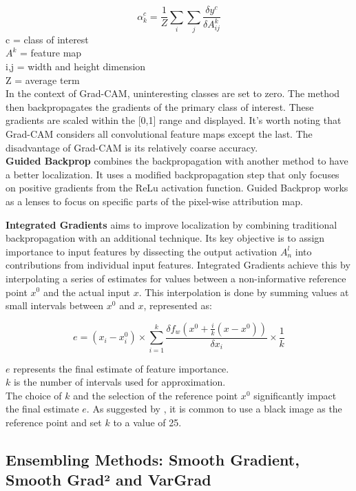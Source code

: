 $$\alpha^c_k = \frac{1}{Z} \sum_{i}\sum_{j} \frac{\delta y^c}{\delta A^k_{ij}}$$
c = class of interest\\
$A^k$ = feature map\\
i,j = width and height dimension\\
Z = average term\\

In the context of Grad-CAM, uninteresting classes are set to zero. The method then backpropagates the gradients of the primary class of interest. These gradients are scaled within the [0,1] range and displayed. It's worth noting that Grad-CAM considers all convolutional feature maps except the last. The disadvantage of Grad-CAM is its relatively coarse accuracy.
\\

\textbf{Guided Backprop} combines the backpropagation \cite{springenberg2015striving} with another method to have a better localization. It uses a modified backpropagation step that only focuses on positive gradients from the ReLu activation function. Guided Backprop works as a lenses to focus on specific parts of the pixel-wise attribution map.

\textbf{Integrated Gradients} \cite {sundararajan2017axiomatic} aims to improve localization by combining traditional backpropagation with an additional technique.  Its key objective is to assign importance to input features by dissecting the output activation $A^l_n$ into contributions from individual input features.
Integrated Gradients achieve this by interpolating a series of estimates for values between a non-informative reference point $x^0$ and the actual input $x$. This interpolation is done by summing values at small intervals between $x^0$ and $x$, represented as:

$$ e = (x_i - x^0_i) \times \sum_{i=1}^{k} \frac{\delta f_w(x^0 + \frac{i}{k}(x - x^0))}{\delta x_i} \times \frac{1}{k} $$

$e$ represents the final estimate of feature importance.\\
$k$ is the number of intervals used for approximation.\\

The choice of $k$ and the selection of the reference point $x^0$ significantly impact the final estimate $e$. As suggested by \cite {sundararajan2017axiomatic}, it is common to use a black image as the reference point and set $k$ to a value of 25.

\subsection{Ensembling Methods: Smooth Gradient, Smooth Grad² and VarGrad}

